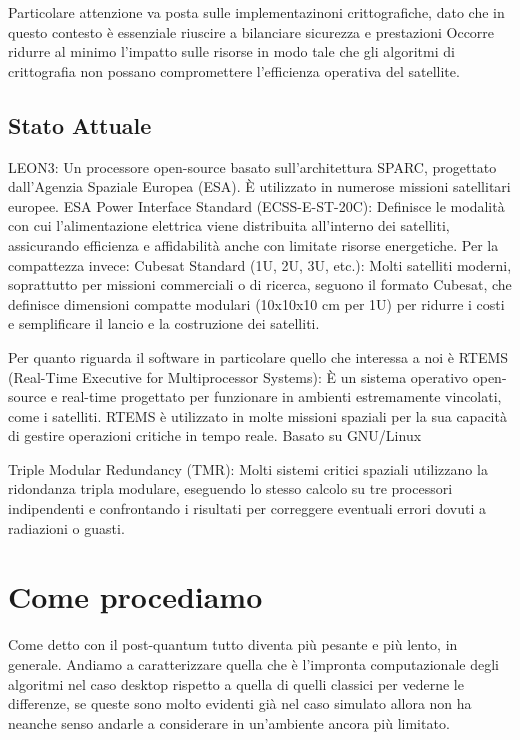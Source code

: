 \noindent
Particolare attenzione va posta sulle implementazinoni crittografiche, dato che in questo contesto è essenziale riuscire a bilanciare sicurezza e prestazioni
Occorre ridurre al minimo l'impatto sulle risorse in modo tale che gli algoritmi di crittografia non possano compromettere l'efficienza operativa del satellite.

\subsection{Stato Attuale}

LEON3: Un processore open-source basato sull'architettura SPARC, progettato dall'Agenzia Spaziale Europea (ESA). È utilizzato in numerose missioni satellitari europee.
ESA Power Interface Standard (ECSS-E-ST-20C): Definisce le modalità con cui l'alimentazione elettrica viene distribuita all'interno dei satelliti, assicurando efficienza e affidabilità anche con limitate risorse energetiche.
Per la compattezza invece: Cubesat Standard (1U, 2U, 3U, etc.): Molti satelliti moderni, soprattutto per missioni commerciali o di ricerca, seguono il formato Cubesat, che definisce dimensioni compatte modulari (10x10x10 cm per 1U) per ridurre i costi e semplificare il lancio e la costruzione dei satelliti.

Per quanto riguarda il software in particolare quello che interessa a noi è RTEMS (Real-Time Executive for Multiprocessor Systems): È un sistema operativo open-source e real-time progettato per funzionare in ambienti estremamente vincolati, come i satelliti. RTEMS è utilizzato in molte missioni spaziali per la sua capacità di gestire operazioni critiche in tempo reale. Basato su GNU/Linux


Triple Modular Redundancy (TMR): Molti sistemi critici spaziali utilizzano la ridondanza tripla modulare, eseguendo lo stesso calcolo su tre processori indipendenti e confrontando i risultati per correggere eventuali errori dovuti a radiazioni o guasti.

\section{Come procediamo}

Come detto con il post-quantum tutto diventa più pesante e più lento, in generale.
Andiamo a caratterizzare quella che è l'impronta computazionale degli algoritmi nel caso desktop rispetto a quella di quelli classici per 
vederne le differenze, se queste sono molto evidenti già nel caso simulato allora non ha neanche senso andarle a considerare in un'ambiente
ancora più limitato.

